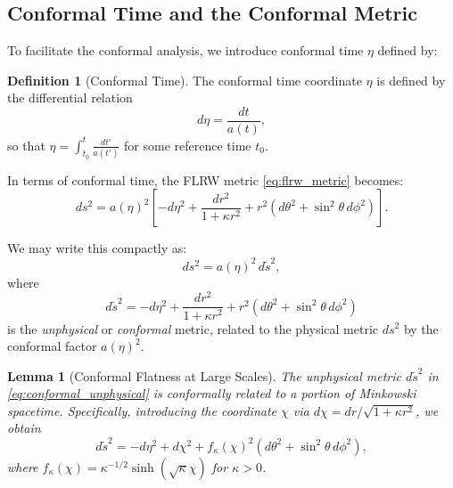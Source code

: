 \documentclass[11pt,a4paper]{article}
\theoremstyle{plain}
\newtheorem{lemma}[theorem]{Lemma}
\theoremstyle{definition}
\newtheorem{definition}[theorem]{Definition}
\theoremstyle{remark}
\begin{document}
\subsection{Conformal Time and the Conformal Metric}

To facilitate the conformal analysis, we introduce conformal time $\eta$ defined by:

\begin{definition}[Conformal Time]\label{def:conformal_time}
The conformal time coordinate $\eta$ is defined by the differential relation
\begin{equation}\label{eq:conformal_time_def}
    d\eta = \frac{dt}{a(t)},
\end{equation}
so that $\eta = \int_{t_0}^{t} \frac{dt'}{a(t')}$ for some reference time $t_0$.
\end{definition}

In terms of conformal time, the FLRW metric \eqref{eq:flrw_metric} becomes:
\begin{equation}\label{eq:conformal_metric}
    ds^2 = a(\eta)^2 \left[ -d\eta^2 + \frac{dr^2}{1 + \kappa r^2} + r^2 \left( d\theta^2 + \sin^2\theta \, d\phi^2 \right) \right].
\end{equation}

We may write this compactly as:
\begin{equation}\label{eq:conformal_factorization}
    ds^2 = a(\eta)^2 \, d\tilde{s}^2,
\end{equation}
where
\begin{equation}\label{eq:conformal_unphysical}
    d\tilde{s}^2 = -d\eta^2 + \frac{dr^2}{1 + \kappa r^2} + r^2 \left( d\theta^2 + \sin^2\theta \, d\phi^2 \right)
\end{equation}
is the \emph{unphysical} or \emph{conformal} metric, related to the physical metric $ds^2$ by the conformal factor $a(\eta)^2$.

\begin{lemma}[Conformal Flatness at Large Scales]\label{lem:conformal_flat}
The unphysical metric $d\tilde{s}^2$ in \eqref{eq:conformal_unphysical} is conformally related to a portion of Minkowski spacetime. Specifically, introducing the coordinate $\chi$ via $d\chi = dr/\sqrt{1 + \kappa r^2}$, we obtain
\begin{equation}
    d\tilde{s}^2 = -d\eta^2 + d\chi^2 + f_\kappa(\chi)^2 \left( d\theta^2 + \sin^2\theta \, d\phi^2 \right),
\end{equation}
where $f_\kappa(\chi) = \kappa^{-1/2} \sinh(\sqrt{\kappa} \chi)$ for $\kappa > 0$.
\end{lemma}
\end{document}
